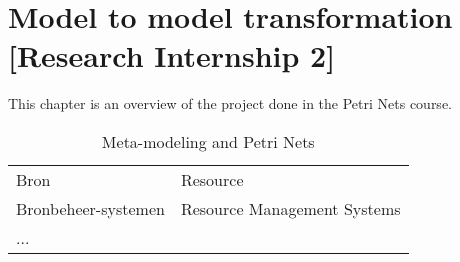 \chapter{Model to model transformation [Research Internship 2]}
 
This chapter is an overview of the project done in the Petri Nets course.

\begin{table}[h]
\centering \begin{tabular}[]{l|l}
Bron & Resource \\
Bronbeheer-systemen & Resource Management Systems \\
...
\end{tabular}
\caption{Meta-modeling and Petri Nets}
\end{table}
